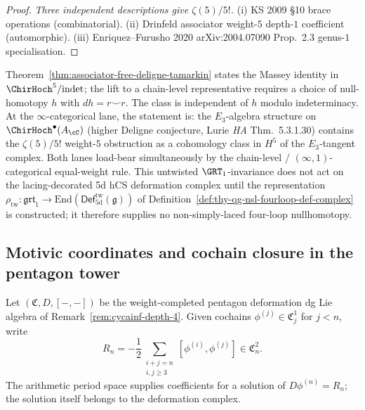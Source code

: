 \begin{proof}
\emph{Three independent descriptions give $\zeta(5)/5!$.} (i) KS 2009 \S 10 brace operations (combinatorial). (ii) Drinfeld associator weight-$5$ depth-$1$ coefficient (automorphic). (iii) Enriquez--Furusho 2020 arXiv:2004.07090 Prop.~2.3 genus-$1$ specialisation.
\qedhere
\end{proof}

\begin{remark}
\label{rem:massey-chain-vs-cohom}
Theorem~\ref{thm:associator-free-deligne-tamarkin} states the Massey identity in $\ChirHoch^5/\mathrm{indet}$; the lift to a chain-level representative requires a choice of null-homotopy $h$ with $dh = r \smile r$. The class is independent of $h$ modulo indeterminacy. At the $\infty$-categorical lane, the statement is: the $E_3$-algebra structure on $\ChirHoch^\bullet(A_\cC)$ (higher Deligne conjecture, Lurie \emph{HA} Thm.~5.3.1.30) contains the $\zeta(5)/5!$ weight-$5$ obstruction as a cohomology class in $H^5$ of the $E_3$-tangent complex. Both lanes load-bear simultaneously by the chain-level / $(\infty,1)$-categorical equal-weight rule.
This untwisted $\GRT_1$-invariance does not act on the lacing-decorated
5d hCS deformation complex until the representation
$\rho_{\mathrm{tw}}\colon\mathfrak{grt}_1\to
\mathrm{End}(\mathsf{Def}^{\mathrm{tw}}_{5\mathrm d}(\mathfrak g))$ of
Definition~\ref{def:thy-qg-nsl-fourloop-def-complex} is constructed;
it therefore supplies no non-simply-laced four-loop nullhomotopy.
\end{remark}

\subsection{Motivic coordinates and cochain closure in the pentagon tower}
\label{subsec:phi-n-doubly-conditional}

Let $(\mathfrak C,D,[-,-])$ be the weight-completed pentagon
deformation dg Lie algebra of Remark~\ref{rem:cycainf-depth-4}.  Given
cochains $\phi^{(j)}\in \mathfrak C^1_j$ for $j<n$, write
\[
 R_n=-\frac12\sum_{\substack{i+j=n\\i,j\geq3}}
 [\phi^{(i)},\phi^{(j)}]
 \in \mathfrak C^2_n .
\]
The arithmetic period space supplies coefficients for a solution of
$D\phi^{(n)}=R_n$; the solution itself belongs to the deformation
complex.

